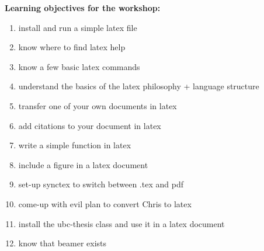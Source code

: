 \documentclass{article}
\begin{document}
\textbf{\large Learning objectives for the workshop:}

\begin{enumerate}
\item install and run a simple latex file 
\item know where to find latex help
\item know a few basic latex commands
\item understand the basics of the latex philosophy + language structure
\item transfer one of your own documents in latex
\item add citations to your document in latex
\item write a simple function in latex %
\item include a figure in a latex document
\item set-up synctex to switch between .tex and pdf
\item come-up with evil plan to convert Chris to latex
\item install the ubc-thesis class and use it in a latex document
\item know that beamer exists
\end{enumerate}
\end{document}
